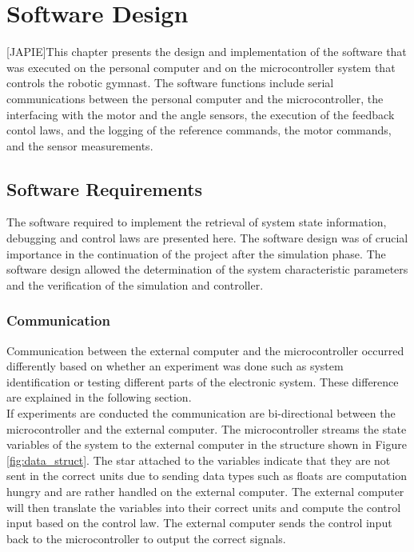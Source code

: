 \chapter{Software Design}
\label{chp:software_design}
[JAPIE]This chapter presents the design and implementation of the software that was executed on the personal computer and on the microcontroller system that controls the robotic gymnast. The software functions include serial communications between the personal computer and the microcontroller, the interfacing with the motor and the angle sensors, the execution of the feedback contol laws, and the logging of the reference commands, the motor commands, and the sensor measurements.
\section{Software Requirements}
\label{sec:software_requirements}
The software required to implement the retrieval of system state information, debugging and control laws are presented here. The software design was of crucial importance in the continuation of the project after the simulation phase. The software design allowed the determination of the system characteristic parameters and the verification of the simulation and controller.

\subsection{Communication}

Communication between the external computer and the microcontroller occurred differently based on whether an experiment was done such as system identification or testing different parts of the electronic system. These difference are explained in the following section.\\

If experiments are conducted the communication are bi-directional between the microcontroller and the external computer. The microcontroller streams the state variables of the system to the external computer in the structure shown in Figure \ref{fig:data_struct}. The star attached to the variables indicate that they are not sent in the correct units due to sending data types such as floats are computation hungry and are rather handled on the external computer. The external computer will then translate the variables into their correct units and compute the control input based on the control law. The external computer sends the control input back to the microcontroller to output the correct signals.\\

